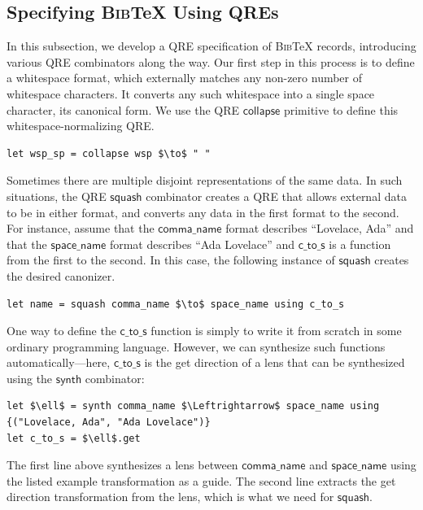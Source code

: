 \documentclass[acmsmall,review,anonymous]{acmart}
\newcommand{\codefont}[1]{\ensuremath{\mathsf{#1}}}
\newcommand{\kw}[1]{\textcolor{dkblue}{\ensuremath{\mathsf{#1}}}}
\newcommand{\bibtex}{\textsc{Bib}\TeX{}}
\begin{document}
\subsection{Specifying \bibtex{} Using QREs}
\label{subsec:qre-expressions}
In this subsection, we develop a QRE specification of \bibtex{}
records, introducing various QRE combinators along the way. 
Our first step in this process is to define a
whitespace format, which externally matches any non-zero number of whitespace
characters. It converts any such whitespace into a single space
character, its canonical form. 
We use the QRE \kw{collapse} primitive to define this
whitespace-normalizing QRE.

\begin{lstlisting}
let wsp_sp = collapse wsp $\to$ " "
\end{lstlisting}
\iflastminute
\fi

Sometimes there are multiple disjoint representations of the same data.
In such situations, the QRE \kw{squash} combinator creates a QRE that
allows external data to be in either format, and converts any
data in the first format to the second.
For instance, assume that
the \codefont{comma\_name} format describes ``Lovelace, Ada''
and that the \codefont{space\_name} format describes ``Ada Lovelace''
and \codefont{c\_to\_s} is a function from the first to the second.  In this
case, the following instance of \kw{squash} creates the desired canonizer.


\begin{lstlisting}
let name = squash comma_name $\to$ space_name using c_to_s
\end{lstlisting}

One way to define the \codefont{c\_to\_s} function
is simply to write it from scratch in some ordinary programming language.
However, we can synthesize such functions automatically---here, \codefont{c\_to\_s} is the
get direction of a lens that can be synthesized using the 
\kw{synth} combinator:
%
\begin{lstlisting}
let $\ell$ = synth comma_name $\Leftrightarrow$ space_name using {("Lovelace, Ada", "Ada Lovelace")}
let c_to_s = $\ell$.get 
\end{lstlisting}
\noindent
The first line above synthesizes a lens between \codefont{comma\_name} and
\codefont{space\_name} using the listed example transformation as a guide.  The
second line extracts the get direction transformation from the lens,
which is what we need for \kw{squash}.
\end{document}
